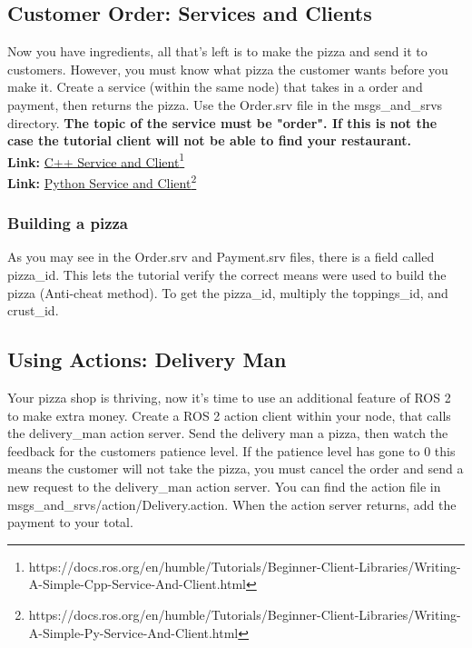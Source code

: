 \documentclass[11pt]{article}
\newcommand{\link}[2]{\textbf{Link: }\textcolor{blue}{\href{#2}{#1}}\footnote{#2}}
\begin{document}
\subsection{Customer Order: Services and Clients}
Now you have ingredients, all that's left is to make the pizza and send it to customers. However, you must know what pizza the customer wants before you make it. Create a service (within the same node) that takes in a order and payment, then returns the pizza. Use the Order.srv file in the msgs\_and\_srvs directory. \textbf{The topic of the service must be "order". If this is not the case the tutorial client will not be able to find your restaurant.}\\
\noindent
\link{C++ Service and Client}{https://docs.ros.org/en/humble/Tutorials/Beginner-Client-Libraries/Writing-A-Simple-Cpp-Service-And-Client.html}\\
\link{Python Service and Client}{https://docs.ros.org/en/humble/Tutorials/Beginner-Client-Libraries/Writing-A-Simple-Py-Service-And-Client.html}

\subsubsection{Building a pizza}
As you may see in the Order.srv and Payment.srv files, there is a field called pizza\_id. This lets the tutorial verify the correct means were used to build the pizza (Anti-cheat method). To get the pizza\_id, multiply the toppings\_id, and crust\_id.


\subsection{Using Actions: Delivery Man}
Your pizza shop is thriving, now it's time to use an additional feature of ROS 2 to make extra money. Create a ROS 2 action client within your node, that calls the delivery\_man action server. Send the delivery man a pizza, then watch the feedback for the customers patience level. If the patience level has gone to 0 this means the customer will not take the pizza, you must cancel the order and send a new request to the delivery\_man action server. You can find the action file in msgs\_and\_srvs/action/Delivery.action. When the action server returns, add the payment to your total.\\
\end{document}
